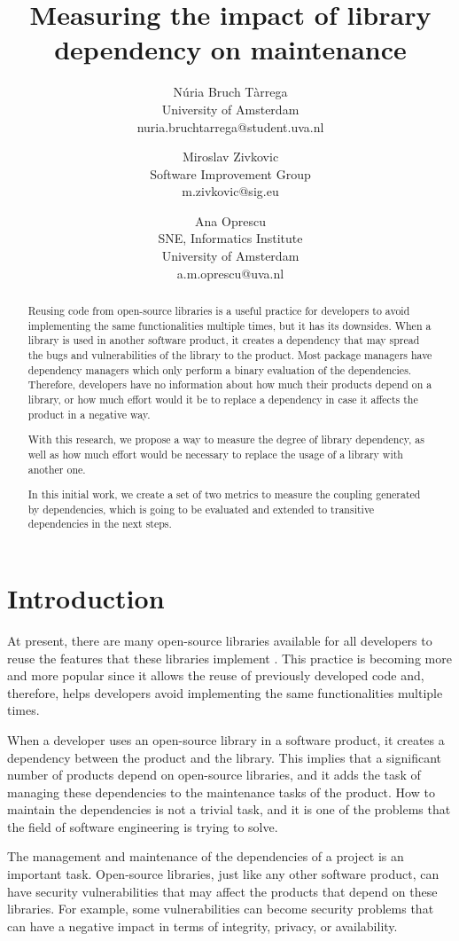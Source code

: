 \documentclass[a4paper]{article}
\title{Measuring the impact of library dependency on maintenance}
\author{
Núria Bruch Tàrrega \\ University of Amsterdam \\ nuria.bruchtarrega@student.uva.nl
\and
Miroslav Zivkovic \\ Software Improvement Group \\ m.zivkovic@sig.eu
\and
Ana Oprescu \\ SNE, Informatics Institute\\
                University of Amsterdam \\ a.m.oprescu@uva.nl
}
\begin{document}
\maketitle

\begin{abstract}
Reusing code from open-source libraries is a useful practice for developers to avoid implementing the same functionalities multiple times, but it has its downsides. When a library is used in another software product, it creates a dependency that may spread the bugs and vulnerabilities of the library to the product. Most package managers have dependency managers which only perform a binary evaluation of the dependencies. Therefore, developers have no information about how much their products depend on a library, or how much effort would it be to replace a dependency in case it affects the product in a negative way.

With this research, we propose a way to measure the degree of library dependency, as well as how much effort would be necessary to replace the usage of a library with another one.

In this initial work, we create a set of two metrics to measure the coupling generated by dependencies, which is going to be evaluated and extended to transitive dependencies in the next steps.
\end{abstract}


\section{Introduction}
At present, there are many open-source libraries available for all developers to reuse the features that these libraries implement \cite{kikas2017structure}. This practice is becoming more and more popular since it allows the reuse of previously developed code and, therefore, helps developers avoid implementing the same functionalities multiple times.

When a developer uses an open-source library in a software product, it creates a dependency between the product and the library. This implies that a significant number of products depend on open-source libraries, and it adds the task of managing these dependencies to the maintenance tasks of the product. How to maintain the dependencies is not a trivial task, and it is one of the problems that the field of software engineering is trying to solve.

The management and maintenance of the dependencies of a project is an important task. Open-source libraries, just like any other software product, can have security vulnerabilities that may affect the products that depend on these libraries. For example, some vulnerabilities can become security problems that can have a negative impact in terms of integrity, privacy, or availability.
\end{document}
